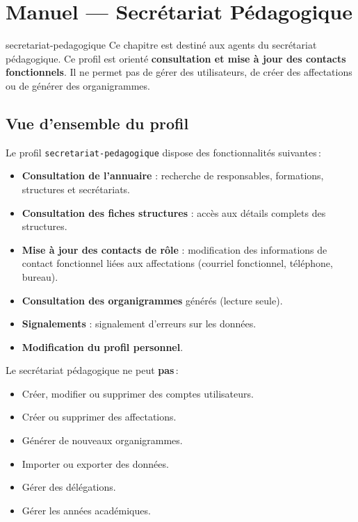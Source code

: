 \chapter{Manuel --- Secr\'etariat P\'edagogique}
\label{chap:secretariat}

\begin{rolebox}{secretariat-pedagogique}
  Ce chapitre est destin\'e aux agents du secr\'etariat p\'edagogique. Ce profil est orient\'e \textbf{consultation et mise \`a jour des contacts fonctionnels}. Il ne permet pas de g\'erer des utilisateurs, de cr\'eer des affectations ou de g\'en\'erer des organigrammes.
\end{rolebox}

\section{Vue d'ensemble du profil}

Le profil \texttt{secretariat-pedagogique} dispose des fonctionnalit\'es suivantes\,:

\begin{itemize}
  \item \textbf{Consultation de l'annuaire} : recherche de responsables, formations, structures et secr\'etariats.
  \item \textbf{Consultation des fiches structures} : acc\`es aux d\'etails complets des structures.
  \item \textbf{Mise \`a jour des contacts de r\^ole} : modification des informations de contact fonctionnel li\'ees aux affectations (courriel fonctionnel, t\'el\'ephone, bureau).
  \item \textbf{Consultation des organigrammes} g\'en\'er\'es (lecture seule).
  \item \textbf{Signalements} : signalement d'erreurs sur les donn\'ees.
  \item \textbf{Modification du profil personnel}.
\end{itemize}

\begin{notebox}
  Le secr\'etariat p\'edagogique ne peut \textbf{pas}\,:
  \begin{itemize}
    \item Cr\'eer, modifier ou supprimer des comptes utilisateurs.
    \item Cr\'eer ou supprimer des affectations.
    \item G\'en\'erer de nouveaux organigrammes.
    \item Importer ou exporter des donn\'ees.
    \item G\'erer des d\'el\'egations.
    \item G\'erer les ann\'ees acad\'emiques.
  \end{itemize}
\end{notebox}

